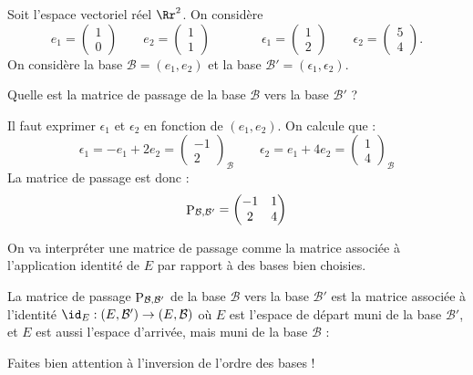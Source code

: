 \documentclass[class=report,crop=false]{standalone}
\begin{document}
\begin{exemple}
Soit l'espace vectoriel réel $\Rr^2$.
On considère
$$
e_1 = \begin{pmatrix}1\\0\end{pmatrix} \qquad
e_2 = \begin{pmatrix}1\\1\end{pmatrix} \qquad\qquad
\epsilon_1 = \begin{pmatrix}1\\2\end{pmatrix} \qquad
\epsilon_2 = \begin{pmatrix}5\\4\end{pmatrix}.$$
On considère la base $\mathcal{B} = (e_1,e_2)$
et la base $\mathcal{B}'=(\epsilon_1,\epsilon_2)$.

Quelle est la matrice de passage de la base $\mathcal{B}$ vers
la base $\mathcal{B}'$ ?

Il faut exprimer $\epsilon_1$ et $\epsilon_2$ en fonction de $(e_1,e_2)$.
On calcule que :
$$\epsilon_1 = -e_1+2e_2 =  \begin{pmatrix}-1\\2\end{pmatrix}_{\!\!\mathcal{B}}
\qquad
\epsilon_2 = e_1+4e_2 =  \begin{pmatrix}1\\4\end{pmatrix}_{\!\!\mathcal{B}}$$
La matrice de passage est donc :
$$\mathop{\mathrm{P}}\nolimits_{\mathcal{B},\mathcal{B'}} =
\begin{pmatrix}-1&1\\2&4\end{pmatrix}$$
\end{exemple}

On va interpréter une matrice de passage comme la matrice associée à
l'application identité de $E$ par rapport à des bases bien choisies.
\begin{proposition}
La matrice de passage $\mathop{\mathrm{P}}\nolimits_{\mathcal{B},\mathcal{B}'}$
de la base $\mathcal{B}$ vers la base $\mathcal{B}'$
est la matrice associée à l'identité $\id_E :  (E, \mathcal{B}') \to (E,\mathcal{B})$
où $E$ est l'espace de départ muni de la base $\mathcal{B}'$,
et $E$ est aussi l'espace d'arrivée, mais muni de la base $\mathcal{B}$ :
\end{proposition}
Faites bien attention à l'inversion de l'ordre des bases !
\end{document}
